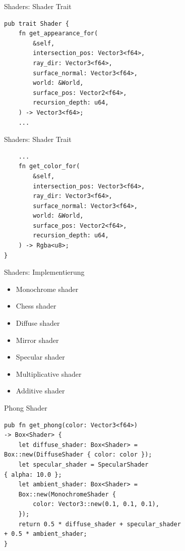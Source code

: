\documentclass{beamer}
\begin{document}
\begin{frame}[fragile]{Shaders: Shader Trait}
    \begin{lstlisting}
pub trait Shader {
    fn get_appearance_for(
        &self,
        intersection_pos: Vector3<f64>,
        ray_dir: Vector3<f64>,
        surface_normal: Vector3<f64>,
        world: &World,
        surface_pos: Vector2<f64>,
        recursion_depth: u64,
    ) -> Vector3<f64>;
    ...
    \end{lstlisting}
\end{frame}
\begin{frame}[fragile]{Shaders: Shader Trait}
    \begin{lstlisting}
    ...
    fn get_color_for(
        &self,
        intersection_pos: Vector3<f64>,
        ray_dir: Vector3<f64>,
        surface_normal: Vector3<f64>,
        world: &World,
        surface_pos: Vector2<f64>,
        recursion_depth: u64,
    ) -> Rgba<u8>;
}
    \end{lstlisting}
\end{frame}
\begin{frame}{Shaders: Implementierung}
    \begin{itemize}[<+->]
        \item Monochrome shader
        \item Chess shader
        \item Diffuse shader
        \item Mirror shader
        \item Specular shader
        \item Multiplicative shader
        \item Additive shader
    \end{itemize}
\end{frame}
\begin{frame}[fragile]{Phong Shader}
    \begin{lstlisting}
pub fn get_phong(color: Vector3<f64>)
-> Box<Shader> {
    let diffuse_shader: Box<Shader> =
Box::new(DiffuseShader { color: color });
    let specular_shader = SpecularShader
{ alpha: 10.0 };
    let ambient_shader: Box<Shader> =
    Box::new(MonochromeShader {
        color: Vector3::new(0.1, 0.1, 0.1),
    });
    return 0.5 * diffuse_shader + specular_shader
+ 0.5 * ambient_shader;
}
    \end{lstlisting}
\end{frame}
\end{document}
